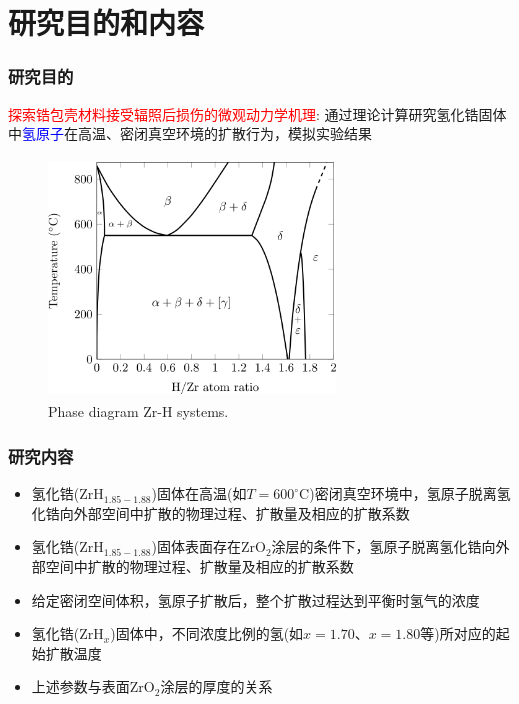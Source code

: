 \section{研究目的和内容}
\begin{frame}
	\frametitle{研究目的}
	\textcolor{red}{探索锆包壳材料接受辐照后损伤的微观动力学机理}:
	\vskip 2pt
	通过理论计算研究氢化锆固体中\textcolor{blue}{氢原子}在高温、密闭真空环境的扩散行为，模拟实验结果
\begin{figure}[!ht]
\centering
\vspace*{-0.05in}
\includegraphics[height=2.50in,width=3.00in,viewport=0 0 930 748,clip]{Figures/Phase_diagram-Zr_H-systems.png}
\caption{\tiny \textrm{Phase diagram Zr-H systems.}}
\label{Fig:Phase_diagram-Zr_H-systems}
\end{figure}
\end{frame}

\begin{frame}
	\frametitle{研究内容}
	\begin{itemize}
	\item 氢化锆($\mathrm{ZrH}_{1.85-1.88}$)固体在高温(如$T=600^{\circ}\mathrm{C}$)密闭真空环境中，氢原子脱离氢化锆向外部空间中扩散的物理过程、扩散量及相应的扩散系数
	\item 氢化锆($\mathrm{ZrH}_{1.85-1.88}$)固体表面存在$\mathrm{ZrO}_2$涂层的条件下，氢原子脱离氢化锆向外部空间中扩散的物理过程、扩散量及相应的扩散系数
	\item 给定密闭空间体积，氢原子扩散后，整个扩散过程达到平衡时氢气的浓度
	\item 氢化锆($\mathrm{ZrH}_x$)固体中，不同浓度比例的氢(如$x=1.70$、$x=1.80$等)所对应的起始扩散温度
	\item 上述参数与表面$\mathrm{ZrO}_2$涂层的厚度的关系
	\end{itemize}
\end{frame}

